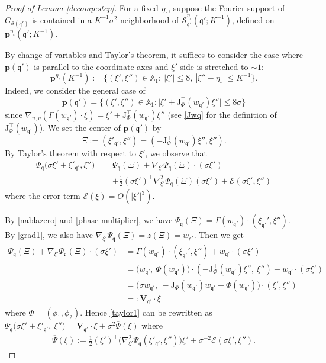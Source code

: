 \documentclass[10pt] %
{amsart}
\theoremstyle{plain}
\numberwithin{equation}{section}
\newcommand{\fq}{\mathfrak q}
\newcommand{\fm}{\mathfrak{q'}}
\begin{document}
\begin{proof}[Proof of Lemma \ref{decomp:step}]

For a fixed $\eta_\circ$, suppose the Fourier support of $G_{\theta(\fm)}$ is contained in a $K^{-1}\sigma^2$-neighborhood of $\mathcal S_{\fq'}^{\eta_\circ}(\fm;K^{-1})$, defined on $\mathbf p^{\eta_\circ}(\fm;K^{-1})$.


By change of variables and Taylor's theorem, it suffices to consider the case where $\mathbf p(\fm)$ is parallel to the coordinate axes and $\xi'$-side  is stretched to $\sim1$:
\[
\overline{\mathbf p}^{\eta_\circ} (K^{-1}) :=  
\{(\xi',\xi'')\in \mathbb A_1:~|\xi'| \le 8 ,~  |\xi'' - \eta_\circ|\le K^{-1} \big\} .
\]
Indeed, we consider the general case of 
\[
\mathbf p(\fm) = 
\big\{(\xi',\xi'') \in \mathbb A_1: 
\big| \xi'+\mathrm J_\Phi^\intercal(w_{\fm})  \xi'' \big| \le 8 \sigma \big\}
\]
since $\nabla_{u,v}(\Gamma(w_\fm)\cdot \xi ) =\xi'+ \mathrm J_\Phi^\intercal(w_{\fm})  \xi''$ (see \eqref{Jwq} for the definition of $\mathrm J_\Phi^\intercal(w_\fm)$).
We set the center of $\mathbf p(\fm)$ by 
\[
\Xi := (\xi'_\fm,\xi'')=(-\mathrm J_\Phi^\intercal(w_\fm)  \xi'', \xi'') .
\]  
By Taylor's theorem with respect to $\xi'$,  we observe that
\begin{equation}
\begin{aligned}\label{taylor1}
\Psi_{\fq} \big(\sigma\xi'+\xi'_\fm,\xi''\big)
=
&\Psi_\fq(\Xi)
+\nabla_{\xi'} \Psi_\fq(\Xi)\cdot (\sigma\xi')\\
&+\frac12(\sigma\xi')^\intercal \nabla_{\xi'}^2 \Psi_\fq(\Xi) (\sigma\xi')
+\mathcal E(\sigma\xi',\xi'') 
\end{aligned}
\end{equation}
where the error term
$\mathcal E(\xi) = O(|\xi'|^3)$.

By \eqref{nablazero} and \eqref{phase-multiplier}, we have  
$
\Psi_\fq(\Xi) = \Gamma(w_\fm)\cdot (\xi_{\fm}',\xi'')$.
By \eqref{grad1}, we also have
$
\nabla_{\xi'} \Psi_\fq(\Xi) =z(\Xi) = w_\fm.
$
Then we get
\begin{align*}
\Psi_\fq(\Xi)
+\nabla_{\xi'} \Psi_\fq(\Xi)\cdot (\sigma\xi')
&=\Gamma(w_\fm)\cdot (\xi_{\fm}',\xi'')+w_{\fm}\cdot(\sigma\xi')\\
&
=\big(w_{\fm},~\Phi(w_\fm)\big)\cdot (-\mathrm J_\Phi^\intercal(w_\fm)  \xi'', ~\xi'')
+w_{\fm}\cdot(\sigma\xi')\\
&=\big(\sigma w_{\fm},~ -\mathrm J_{\Phi}(w_\fm)w_{\fm}+\Phi(w_\fm)\big)\cdot (\xi',\xi'')\\
&=:\mathbf V_{\fm}\cdot\xi
\end{align*}
where $\Phi=(\phi_1,\phi_2)$.
Hence \eqref{taylor1} can be rewritten as
$\Psi_{\fq}\big(\sigma\xi'+\xi'_\fm,~\xi''\big)
=\mathbf V_{\fm}\cdot\xi+ \sigma^2\overline \Psi(\xi)$
where
\begin{align}\label{taylor2}
\overline \Psi(\xi):=\frac12(\xi')^\intercal \big(\nabla_{\xi'}^2 \Psi_\fq(\xi'_\fm,\xi'')\big) \xi'+\sigma^{-2}\mathcal E(\sigma\xi',\xi'').
\end{align}



\end{proof}
\end{document}
